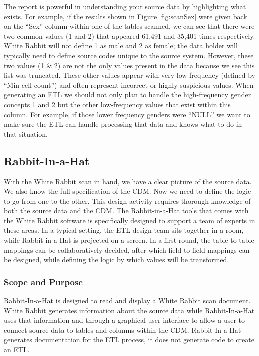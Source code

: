 \documentclass[11pt]{book}
\theoremstyle{definition}
\theoremstyle{definition}
\theoremstyle{definition}
\theoremstyle{remark}
\begin{document}
The report is powerful in understanding your source data by highlighting
what exists. For example, if the results shown in Figure
\ref{fig:scanSex} were given back on the ``Sex'' column within one of
the tables scanned, we can see that there were two common values (1 and
2) that appeared 61,491 and 35,401 times respectively. White Rabbit will
not define 1 as male and 2 as female; the data holder will typically
need to define source codes unique to the source system. However, these
two values (1 \& 2) are not the only values present in the data because
we see this list was truncated. These other values appear with very low
frequency (defined by ``Min cell count'') and often represent incorrect
or highly suspicious values. When generating an ETL we should not only
plan to handle the high-frequency gender concepts 1 and 2 but the other
low-frequency values that exist within this column. For example, if
those lower frequency genders were ``NULL'' we want to make sure the ETL
can handle processing that data and knows what to do in that situation.

\subsection{Rabbit-In-a-Hat}\label{rabbit-in-a-hat}

With the White Rabbit scan in hand, we have a clear picture of the
source data. We also know the full specification of the CDM. Now we need
to define the logic to go from one to the other. This design activity
requires thorough knowledge of both the source data and the CDM. The
Rabbit-in-a-Hat tools that comes with the White Rabbit software is
specifically designed to support a team of experts in these areas. In a
typical setting, the ETL design team sits together in a room, while
Rabbit-in-a-Hat is projected on a screen. In a first round, the
table-to-table mappings can be collaboratively decided, after which
field-to-field mappings can be designed, while defining the logic by
which values will be transformed. 

\subsubsection*{Scope and Purpose}\label{scope-and-purpose-1}

Rabbit-In-a-Hat is designed to read and display a White Rabbit scan
document. White Rabbit generates information about the source data while
Rabbit-In-a-Hat uses that information and through a graphical user
interface to allow a user to connect source data to tables and columns
within the CDM. Rabbit-In-a-Hat generates documentation for the ETL
process, it does not generate code to create an ETL.
\end{document}
